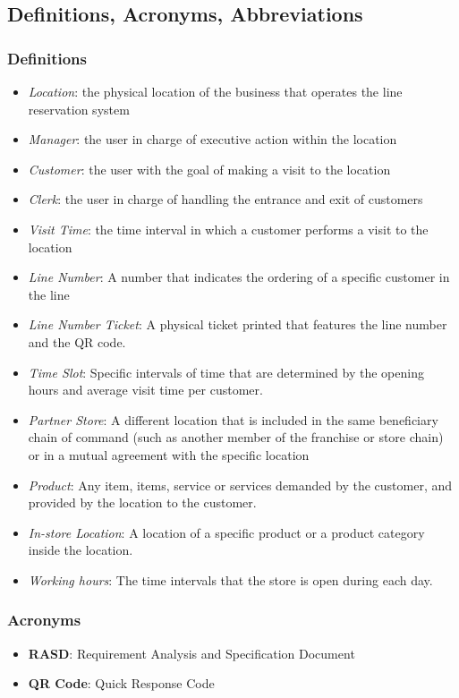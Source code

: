 \subsection{Definitions, Acronyms, Abbreviations}
\subsubsection{Definitions}
\begin{itemize}
    \item \textit{Location}: the physical location of the business that operates the line reservation system
    \item \textit{Manager}: the user in charge of executive action within the location
    \item \textit{Customer}: the user with the goal of making a visit to the location
    \item \textit{Clerk}: the user in charge of handling the entrance and exit of customers
    \item \textit{Visit Time}: the time interval in which a customer performs a visit to the location
    \item \textit{Line Number}: A number that indicates the ordering of a specific customer in the line
    \item \textit{Line Number Ticket}: A physical ticket printed that features the line number and the QR code.
    \item \textit{Time Slot}: Specific intervals of time that are determined by the opening hours and average visit time per customer.
    \item \textit{Partner Store}: A different location that is included in the same beneficiary chain of command (such as another member of the franchise or store chain) or in a mutual agreement with the specific location
    \item \textit{Product}: Any item, items, service or services demanded by the customer, and provided by the location to the customer.
    \item \textit{In-store Location}: A location of a specific product or a product category inside the location.
    \item \textit{Working hours}: The time intervals that the store is open during each day.
\end{itemize}
\subsubsection{Acronyms}
\begin{itemize}
    \item \textbf{RASD}: Requirement Analysis and Specification Document
    \item \textbf{QR Code}: Quick Response Code
\end{itemize}
